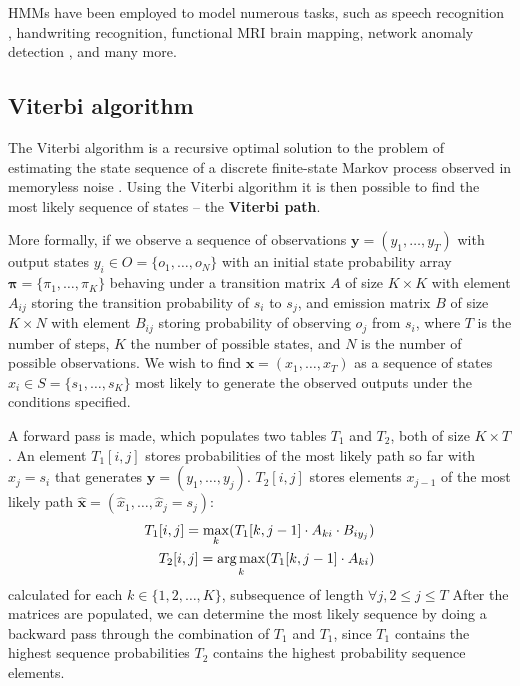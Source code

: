 HMMs have been employed to model numerous tasks, such as 
speech recognition \citep{schuller2003hidden},
handwriting recognition, functional MRI brain mapping,  network anomaly
detection \citep{yu2010hidden}, and many more.

\subsection{Viterbi algorithm}
\label{sec:viterbi}

The Viterbi algorithm is a recursive optimal solution to the problem of
estimating the state sequence of a discrete finite-state Markov process
\citep{howard1960dynamic} observed in memoryless noise
\citep{forney1973viterbi}. Using the Viterbi algorithm it is then possible 
to find the most likely sequence of states -- 
the \textbf{Viterbi path}.

More formally, if we observe a sequence of
observations $\textbf{y} = (y_1, \dots, y_T)$ with output states
$y_i \in O = \{o_1, \dots, o_N\}$ with an initial state probability
  array $\bm{\pi} = \{\pi_1,\dots, \pi_K\}$
behaving under a transition matrix $A$ of size $K \times K$
with element $A_{ij}$ storing the transition probability of
$s_i$ to $s_j$, 
and emission matrix $B$ of size $K \times N$ with 
element $B_{ij}$ storing probability of observing $o_j$ from $s_i$,
where $T$ is the number of steps, 
$K$ the number of possible states, and $N$ is the number of 
possible observations. We wish to find
$\textbf{x} = (x_1, \dots, x_T)$
as a sequence of states $x_i \in S = \{s_1, \dots, s_K\}$ 
most likely to generate the observed outputs under the 
conditions specified. 

A forward pass is made, which populates two
tables $T_1$ and $T_2$, both of size
$K \times T$. An element $T_1[i, j]$ stores 
probabilities of the most likely path so far with 
$x_j = s_i$ that generates $\textbf{y} = (y_1, \dots, y_j)$.
$T_2[i, j]$ stores elements $x_{j - 1}$ of the most
likely path $\bm{\hat{x}} = (\hat{x}_1, \dots, \hat{x}_j = s_j)$:
\begin{align*}
T_1[i, j] = \max_k (T_1[k, j - 1] \cdot A_{ki} \cdot B_{iy_j}) \\
T_2[i, j] = \operatorname*{arg\,max}_k (T_1[k, j - 1] \cdot A_{ki})
\end{align*}
calculated for each $k \in \{1, 2, \dots, K\}$, subsequence
of length $\forall j, 2 \leq j \leq T$
After the matrices are populated, we can determine the most likely sequence
by doing a backward pass through the combination of 
$T_1$ and $T_1$, since $T_1$ contains the highest sequence probabilities
$T_2$ contains the highest probability sequence elements. 

